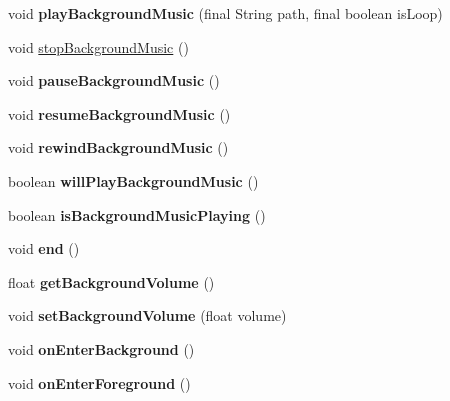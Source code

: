\begin{DoxyCompactItemize}
void {\bfseries play\+Background\+Music} (final String path, final boolean is\+Loop)
\item 
void \hyperlink{classorg_1_1cocos2dx_1_1lib_1_1Cocos2dxMusic_a0f376e36d6226ced411843f49c518d91}{stop\+Background\+Music} ()
\item 
\mbox{\label{classorg_1_1cocos2dx_1_1lib_1_1Cocos2dxMusic_a8e276f0881017f8b2e9923f87f67995a}} 
void {\bfseries pause\+Background\+Music} ()
\item 
\mbox{\label{classorg_1_1cocos2dx_1_1lib_1_1Cocos2dxMusic_ad54aeeecc2814e5eb60caa23500b0cd1}} 
void {\bfseries resume\+Background\+Music} ()
\item 
\mbox{\label{classorg_1_1cocos2dx_1_1lib_1_1Cocos2dxMusic_a9a7d5d7f2b3307edc23a0b158323b1a4}} 
void {\bfseries rewind\+Background\+Music} ()
\item 
\mbox{\label{classorg_1_1cocos2dx_1_1lib_1_1Cocos2dxMusic_aa67541e35e30acece25c9452ecb6f747}} 
boolean {\bfseries will\+Play\+Background\+Music} ()
\item 
\mbox{\label{classorg_1_1cocos2dx_1_1lib_1_1Cocos2dxMusic_a0b81f6d54ee4da0b1d1c38aeec7552a4}} 
boolean {\bfseries is\+Background\+Music\+Playing} ()
\item 
\mbox{\label{classorg_1_1cocos2dx_1_1lib_1_1Cocos2dxMusic_a1c027a9c0a568764a1083af1eca554fb}} 
void {\bfseries end} ()
\item 
\mbox{\label{classorg_1_1cocos2dx_1_1lib_1_1Cocos2dxMusic_a3fd0a274fec1ad5db0b0f6365303b6f5}} 
float {\bfseries get\+Background\+Volume} ()
\item 
\mbox{\label{classorg_1_1cocos2dx_1_1lib_1_1Cocos2dxMusic_ab9486e90c277d6ecc71b1c6db8a89d1c}} 
void {\bfseries set\+Background\+Volume} (float volume)
\item 
\mbox{\label{classorg_1_1cocos2dx_1_1lib_1_1Cocos2dxMusic_aaf4f25519c43fd424f7b9d7ecbd2e942}} 
void {\bfseries on\+Enter\+Background} ()
\item 
\mbox{\label{classorg_1_1cocos2dx_1_1lib_1_1Cocos2dxMusic_a78d56500fb9172064c70d70f87ccb7bd}} 
void {\bfseries on\+Enter\+Foreground} ()
\end{DoxyCompactItemize}


